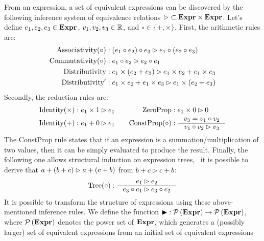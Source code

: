 From an expression, a set of equivalent expressions can be discovered by
the following inference system of equivalence relations $\mathbin{\rhd} \subset
\mathbf{Expr}\times\mathbf{Expr}$. Let's define $e_1, e_2, e_3 \in \mathbf{Expr}$, $v_1, v_2,
v_3 \in \mathbb{R}$, and $\circ \in \{+, \times\}$. First, the arithmetic rules
are:
\begin{equation*}
    \begin{aligned}
        \text{Associativity}(\circ)
            &: (e_1 \circ e_2) \circ e_3 \mathbin{\rhd} e_1 \circ (e_2 \circ e_3) \\
        \text{Commutativity}(\circ)
            &: e_1 \circ e_2 \mathbin{\rhd} e_2 \circ e_1 \\
        \text{Distributivity}
            &: e_1 \times (e_2 + e_3) \mathbin{\rhd} e_1 \times e_2 + e_1 \times e_3 \\
        \text{Distributivity}^\prime
            &: e_1 \times e_2 + e_1 \times e_3 \mathbin{\rhd} e_1 \times (e_2 + e_3)
    \end{aligned}
\end{equation*}
Secondly, the reduction rules are:
\begin{equation*}
    \begin{aligned}
        \text{Identity($\times$)}
            &: e_1 \times 1 \eqrel e_1 \quad &
        \text{ZeroProp}
            &: e_1 \times 0 \eqrel 0 \\
        \text{Identity($+$)}
            &: e_1 + 0 \eqrel e_1 &
        \text{ConstProp}(\circ)
            &: \inference{v_3 = v_1 \circ v_2}{v_1 \circ v_2 \eqrel v_3}
    \end{aligned}
\end{equation*}
The ConstProp rule states that if an expression is a summation/multiplication
of two values, then it can be simply evaluated to produce the result. Finally,
the following one allows structural induction on expression trees, \ie~it is
possible to derive that $a + (b + c) \mathbin{\rhd} a + (c + b)$ from $b + c \mathbin{\rhd} c +
b$:
\begin{equation}
    \text{Tree}(\circ)
        : \inference{e_1 \eqrel e_2}{e_3 \circ e_1 \eqrel e_3 \circ e_2}
    \label{eq:equivalence_inference}
\end{equation}
It is possible to transform the structure of expressions using these
above-mentioned inference rules. We define the function $\operatorname{\blacktriangleright}:
\mathcal{P}\left({\mathbf{Expr}}\right)\to\mathcal{P}\left({\mathbf{Expr}}\right)$, where $\mathcal{P}\left({\mathbf{Expr}}\right)$
denotes the power set of $\mathbf{Expr}$, which generates a (possibly larger)
set of equivalent expressions from an initial set of equivalent expressions
